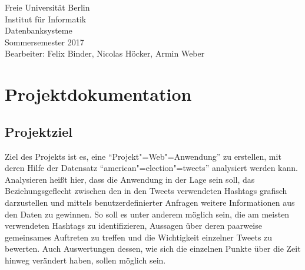 \documentclass[BCOR0mm,fontsize=12pt,paper=a4,final,numbers=noenddot]{scrartcl}
\begin{document}
\makeatletter         

\renewcommand*{\thesubsection}{\@arabic\c@subsection.}
\renewcommand*{\thesubsubsection}{\@alph\c@subsubsection)}
\titleformat{\section}[hang]{\sffamily\bfseries\LARGE\centering}{\thesection}{5pt}{}
\titleformat{\subsection}[hang]{\sffamily\bfseries\Large}{\thesubsection}{5pt}{}


\makeatother


\setlength{\baselineskip}{11pt}

\noindent{}\begin{footnotesize}Freie Universität Berlin\\
Institut für Informatik\\
Datenbanksysteme\\
Sommersemester 2017\\
Bearbeiter: Felix Binder, Nicolas Höcker, Armin Weber\\
\end{footnotesize}

\setlength{\baselineskip}{12pt}

\bigskip

\section*{Projektdokumentation}

\onehalfspacing

\subsection{Projektziel}

Ziel des Projekts ist es, eine "`Projekt"=Web"=Anwendung"' zu erstellen, mit deren Hilfe der Datensatz "`american"=election"=tweets"' analysiert werden kann. Analysieren heißt hier, dass die Anwendung in der Lage sein soll, das Beziehungsgeflecht zwischen den in den Tweets verwendeten Hashtags grafisch darzustellen und mittels benutzerdefinierter Anfragen weitere Informationen aus den Daten zu gewinnen. So soll es unter anderem möglich sein, die am meisten verwendeten Hashtags zu identifizieren, Aussagen über deren paarweise gemeinsames Auftreten zu treffen und die Wichtigkeit einzelner Tweets zu bewerten. Auch Auswertungen dessen, wie sich die einzelnen Punkte über die Zeit hinweg verändert haben, sollen möglich sein.
\end{document}
